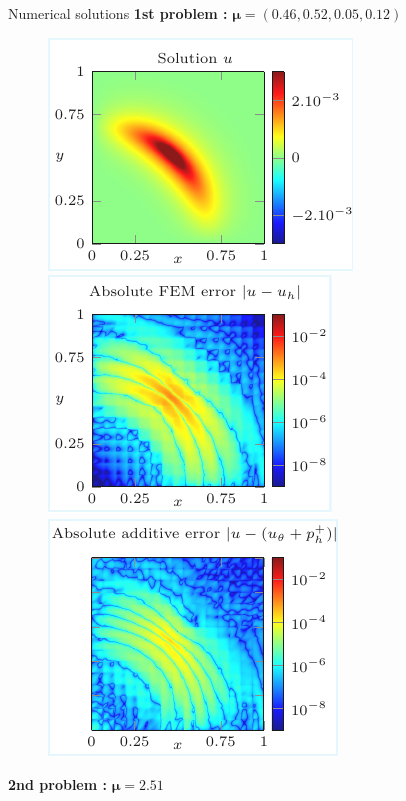 \begin{frame}{Numerical solutions}
	\vspace{-3pt}
	\textbf{1st problem :} $\bm{\mu}=(0.46,0.52,0.05,0.12)$

	\vspace{-8pt}
	\begin{figure}[!ht] \centering
		\includegraphics[width=0.34\linewidth]{images/numeric/elliptic/plots/solution.pdf}		
		\includegraphics[width=0.31\linewidth]{images/numeric/elliptic/plots/error_FEM.pdf}	
		\includegraphics[width=0.31\linewidth]{images/numeric/elliptic/plots/error_ADD.pdf}	
	\end{figure}

	\vspace{-3pt}
	\textbf{2nd problem :} $\bm{\mu}=2.51 $


\end{frame}

